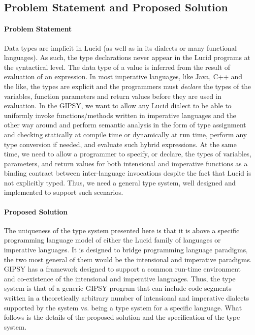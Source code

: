 \documentclass{easychair}
\newcommand{\gipsy}{{GIPSY\index{GIPSY}}}
\newcommand{\lucid}{{Lucid\index{Lucid}}}
\newcommand{\cpp}{{C++\index{C++}}}
\newcommand{\java}{{Java\index{Java}}}
\begin{document}
\subsection{Problem Statement and Proposed Solution}

\paragraph{Problem Statement}

Data types are implicit in {\lucid} (as well as in its dialects or many functional languages). As such, the type declarations never appear in the Lucid programs at the syntactical level. The data type of a value is inferred from the result of evaluation of an expression. In most imperative languages, like {\java}, {\cpp} and the like, the types are explicit and the programmers must {\em declare} the types of the variables, function parameters and return values before they are used in evaluation. In the {\gipsy}, we want to allow any Lucid dialect to be able to uniformly invoke functions/methods written in imperative languages and the other way around and perform semantic analysis in the form of type assignment and checking statically at compile time or dynamically at run time, perform any type conversion if needed, and evaluate such hybrid expressions. At the same time, we need to allow a programmer to specify, or declare, the types of variables, parameters, and return values for both intensional and imperative functions as a binding contract between inter-language invocations despite the fact that {\lucid} is not explicitly typed. Thus, we need a general type system, well designed and implemented to support such scenarios.


\paragraph{Proposed Solution}

The uniqueness of the type system presented here is that it is above a specific programming language model of either the Lucid family of languages or imperative languages. It is designed to bridge programming language paradigms, the two most general of them would be the intensional and imperative paradigms. {\gipsy} has a framework designed to support a common run-time environment and co-existence of the intensional and imperative languages. Thus, the type system is that of a generic GIPSY program that can include code segments written in a theoretically arbitrary number of intensional and imperative dialects supported by the system vs. being a type system for a specific language. What follows is the details of the proposed solution and the specification of the type system.
\end{document}

